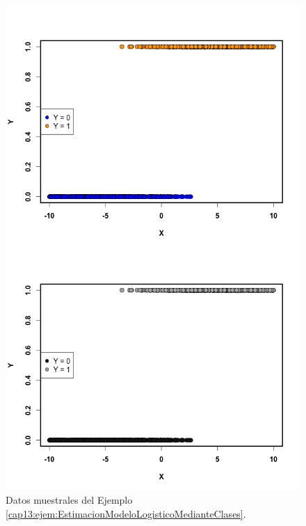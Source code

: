 \begin{ejemplo}
\begin{figure}[h!]
\begin{center}
\begin{enColor}
   \includegraphics[width=13cm]{../fig/Cap13-EjemploConstruccionModeloLogistico01.png}
\end{enColor}
\begin{bn}
    \includegraphics[width=13cm]{../fig/Cap13-EjemploConstruccionModeloLogistico01-bn.png}
\end{bn}
\end{center}
    \caption{ Datos muestrales del Ejemplo \ref{cap13:ejem:EstimacionModeloLogisticoMedianteClases}. }

\end{figure}
\end{ejemplo}
